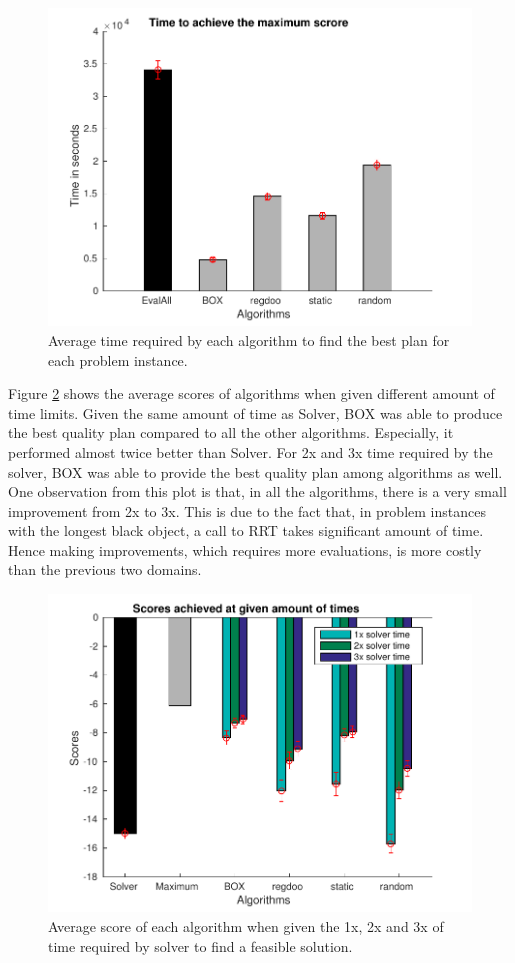 \begin{figure}[htb]
\centering
\includegraphics[scale=0.5]{./figures/place_and_partial_path_opt_time_plot.pdf}
\caption{ Average time required by each algorithm to find the best plan for each problem instance. }
\label{fig:opt_time_plot_pp}
\end{figure} 
Figure \ref{fig:opt_plot_pp} shows the average scores of algorithms when
given different amount of time limits. Given the same amount of
time as Solver, BOX was able to produce the best quality plan compared
to all the other algorithms. Especially, it performed almost
twice better than Solver. For 2x and 3x time required by the solver,
BOX was able to provide the best quality plan among algorithms as well.
One observation from this plot is that, in all the algorithms,
 there is a very small improvement from 2x to 3x. This is due to
the fact that, in problem instances with the longest black object,
a call to RRT takes significant amount of time. Hence making improvements,
which requires more evaluations, is more costly than the previous two
domains. 


\begin{figure}[htb]
\centering
\includegraphics[scale=0.5]{./figures/place_and_partial_path_opt_plot.pdf}
\caption{ Average score of each algorithm when given the 1x, 2x and 3x of time required by solver to find a feasible solution. }
\label{fig:opt_plot_pp}
\end{figure} 

